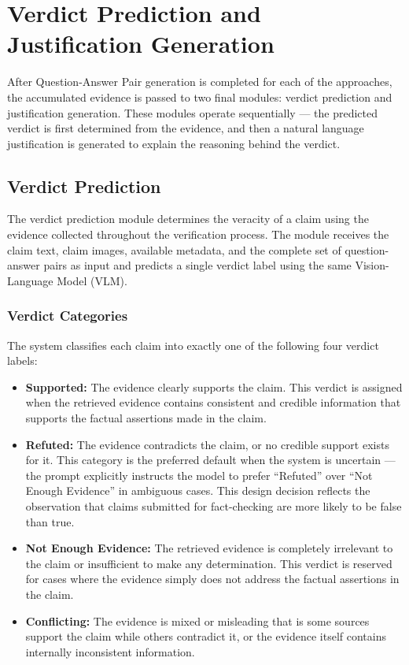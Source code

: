 \section{Verdict Prediction and Justification Generation}

After Question-Answer Pair generation is completed for each of the approaches, the accumulated evidence is passed to two final modules: verdict prediction and justification generation. These modules operate sequentially — the predicted verdict is first determined from the evidence, and then a natural language justification is generated to explain the reasoning behind the verdict.

\subsection{Verdict Prediction}

The verdict prediction module determines the veracity of a claim using the evidence collected throughout the verification process. The module receives the claim text, claim images, available metadata, and the complete set of question-answer pairs as input and predicts a single verdict label using the same Vision-Language Model (VLM).

\subsubsection{Verdict Categories}

The system classifies each claim into exactly one of the following four verdict labels:

\begin{itemize}
    \item \textbf{Supported:} The evidence clearly supports the claim. This verdict is assigned when the retrieved evidence contains consistent and credible information that supports the factual assertions made in the claim.
    \item \textbf{Refuted:} The evidence contradicts the claim, or no credible support exists for it. This category is the preferred default when the system is uncertain — the prompt explicitly instructs the model to prefer ``Refuted'' over ``Not Enough Evidence'' in ambiguous cases. This design decision reflects the observation that claims submitted for fact-checking are more likely to be false than true.
    \item \textbf{Not Enough Evidence:} The retrieved evidence is completely irrelevant to the claim or insufficient to make any determination. This verdict is reserved for cases where the evidence simply does not address the factual assertions in the claim.
    \item \textbf{Conflicting:} The evidence is mixed or misleading that is some sources support the claim while others contradict it, or the evidence itself contains internally inconsistent information.
\end{itemize}

